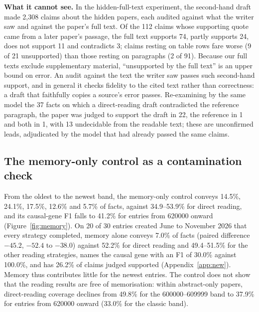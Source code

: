 \documentclass{article} %
\begin{document}
\textbf{What it cannot see.} In the hidden-full-text experiment, the second-hand draft made 2,308 claims about the hidden papers, each audited against what the writer saw and against the paper's full text. Of the 112 claims whose supporting quote came from a later paper's passage, the full text supports 74, partly supports 24, does not support 11 and contradicts 3; claims resting on table rows fare worse (9 of 21 unsupported) than those resting on paragraphs (2 of 91). Because our full texts exclude supplementary material, ``unsupported by the full text'' is an upper bound on error. An audit against the text the writer saw passes such second-hand support, and in general it checks fidelity to the cited text rather than correctness: a draft that faithfully copies a source's error passes. Re-examining by the same model the 37 facts on which a direct-reading draft contradicted the reference paragraph, the paper was judged to support the draft in 22, the reference in 1 and both in 1, with 13 undecidable from the readable text; these are unconfirmed leads, adjudicated by the model that had already passed the same claims.

\subsection{The memory-only control as a contamination check}
\label{sec:memory}
From the oldest to the newest band, the memory-only control conveys 14.5\%, 24.1\%, 17.5\%, 12.6\% and 5.7\% of facts, against 34.9--53.9\% for direct reading, and its causal-gene F1 falls to 41.2\% for entries from 620000 onward (Figure~\ref{fig:memory}). On 20 of 30 entries created June to November 2026 that every strategy completed, memory alone conveys 7.0\% of facts (paired difference $-45.2$, $-52.4$ to $-38.0$) against 52.2\% for direct reading and 49.4--51.5\% for the other reading strategies, names the causal gene with an F1 of 30.0\% against 100.0\%, and has 26.2\% of claims judged supported (Appendix~\ref{app:new}). Memory thus contributes little for the newest entries. The control does not show that the reading results are free of memorisation: within abstract-only papers, direct-reading coverage declines from 49.8\% for the 600000--609999 band to 37.9\% for entries from 620000 onward (33.0\% for the classic band).
\end{document}
